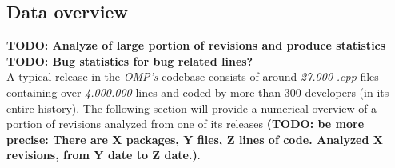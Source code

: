 \subsection{Data overview}

\textbf{TODO: Analyze of large portion of revisions and produce statistics}\\
\textbf{TODO: Bug statistics for bug related lines?}\\

A typical release in the \textit{OMP's} codebase consists of around \textit{27.000} \textit{.cpp} files containing over \textit{4.000.000} lines and coded by more than 300 developers (in its entire history). The following section will provide a numerical overview of a portion of revisions analyzed from one of its releases \textbf{(TODO: be more precise: There are X packages, Y files, Z lines of code. Analyzed X revisions, from Y date to Z date.)}.



